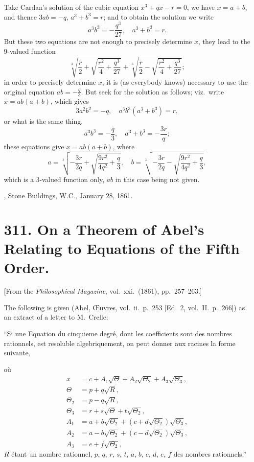 \documentclass[11pt,a4paper]{article}
\theoremstyle{plain}
\begin{document}
Take Cardan's solution of the cubic equation $x^3 + qx - r = 0$, we have $x = a + b$, and thence $3ab = -q$, $a^3 + b^3 = r$; and to obtain the solution we write
\[
a^3b^3 = -\frac{q^3}{27}, \quad a^3 + b^3 = r.
\]
But these two equations are not enough to precisely determine $x$, they lead to the 9-valued function
\[
\sqrt[3]{\frac{r}{2} + \sqrt{\frac{r^2}{4} + \frac{q^3}{27}}} + \sqrt[3]{\frac{r}{2} - \sqrt{\frac{r^2}{4} + \frac{q^3}{27}}};
\]
in order to precisely determine $x$, it is (as everybody knows) necessary to use the original equation $ab = -\frac{q}{3}$. But seek for the solution as follows; viz.\ write $x = ab(a+b)$, which gives
\[
3a^2b^2 = -q, \quad a^3b^3(a^3+b^3) = r,
\]
or what is the same thing,
\[
a^3b^3 = -\frac{q}{3}, \quad a^3 + b^3 = -\frac{3r}{q};
\]
these equations give $x = ab(a+b)$, where
\[
a = \sqrt[3]{-\frac{3r}{2q} + \sqrt{\frac{9r^2}{4q^2} + \frac{q}{3}}}, \quad b = \sqrt[3]{-\frac{3r}{2q} - \sqrt{\frac{9r^2}{4q^2} + \frac{q}{3}}},
\]
which is a 3-valued function only, $ab$ in this case being not given.

\medskip
{}, Stone Buildings, W.C., January 28, 1861.


\newpage
\section*{311. On a Theorem of Abel's Relating to Equations of the Fifth Order.}

[From the \textit{Philosophical Magazine}, vol.\ xxi.\ (1861), pp.\ 257--263.]

\medskip

The following is given (Abel, \OE uvres, vol.\ ii.\ p.\ 253 [Ed.\ 2, vol.\ II.\ p.\ 266]) as an extract of a letter to M.\ Crelle:

``Si une Equation du cinquieme degr\'{e}, dont les coefficients sont des nombres rationnels, est resoluble algebriquement, on peut donner aux racines la forme suivante,

o\`{u}
\begin{align*}
x &= c + A_1\sqrt{\Theta} + A_2\sqrt{\Theta_2} + A_3\sqrt{\Theta_3}, \\
\Theta &= p + q\sqrt{R}, \\
\Theta_2 &= p - q\sqrt{R}, \\
\Theta_3 &= r + s\sqrt{\Theta} + t\sqrt{\Theta_2}, \\
A_1 &= a + b\sqrt{\Theta_2} + (c + d\sqrt{\Theta_2})\sqrt{\Theta_3}, \\
A_2 &= a - b\sqrt{\Theta_2} + (c - d\sqrt{\Theta_2})\sqrt{\Theta_3}, \\
A_3 &= e + f\sqrt{\Theta_2},
\end{align*}
$R$ \'{e}tant un nombre rationnel, $p$, $q$, $r$, $s$, $t$, $a$, $b$, $c$, $d$, $e$, $f$ des nombres rationnels.''
\end{document}
